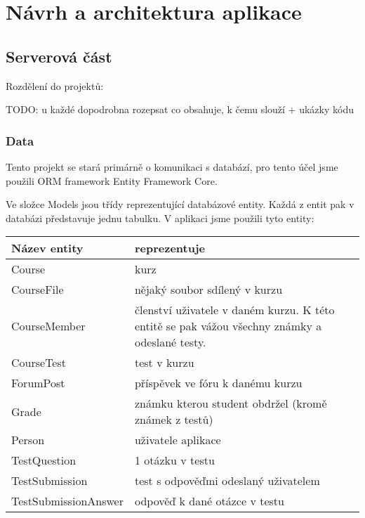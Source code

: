 \chapter{Návrh a architektura aplikace}

\section{Serverová část}

Rozdělení do projektů:

TODO: u každé dopodrobna rozepsat co obsahuje, k čemu slouží + ukázky kódu

\subsection{Data}

Tento projekt se stará primárně o komunikaci s databází, pro tento účel jsme použili ORM framework Entity Framework Core. 

Ve složce Models jsou třídy reprezentující databázové entity. Každá z entit pak v databázi představuje jednu tabulku. V aplikaci jsme použili tyto entity:

\begin{table}[ht]
	\centering
	\begin{tabular}{| l | p{9cm} |}
		\hline
		Název entity & reprezentuje \\
		\hline \hline
		Course & kurz \\ \hline
		CourseFile & nějaký soubor sdílený v kurzu \\ \hline
		CourseMember & členství uživatele v daném kurzu. 
		K této entitě se pak vážou všechny známky a odeslané testy. \\ \hline
		CourseTest & test v kurzu \\ \hline
		ForumPost & příspěvek ve fóru k danému kurzu \\ \hline
		Grade & známku kterou student obdržel (kromě známek z testů) \\ \hline
		Person & uživatele aplikace \\ \hline
		TestQuestion & 1 otázku v testu \\ \hline
		TestSubmission & test s odpověďmi odeslaný uživatelem \\ \hline
		TestSubmissionAnswer & odpověď k dané otázce v testu \\
		\hline
	\end{tabular}
\end{table}

